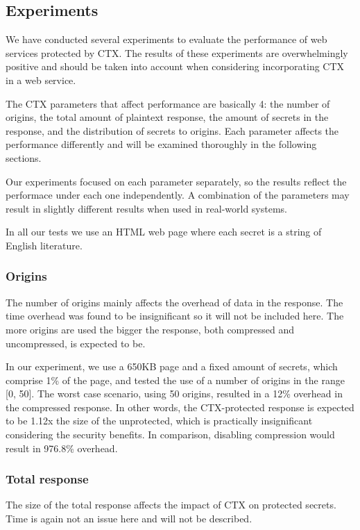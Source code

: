 \documentclass[a4paper, 11 pt, conference]{article}  %
\begin{document}
\subsection{Experiments}
We have conducted several experiments to evaluate the performance of web
services protected by CTX. The results of these experiments are overwhelmingly
positive and should be taken into account when considering incorporating CTX in
a web service.

The CTX parameters that affect performance are basically 4: the number of
origins, the total amount of plaintext response, the amount of secrets in the
response, and the distribution of secrets to origins. Each parameter affects the
performance differently and will be examined thoroughly in the following
sections.

Our experiments focused on each parameter separately, so the results reflect the
performace under each one independently. A combination of the parameters may
result in slightly different results when used in real-world systems.

In all our tests we use an HTML web page where each secret is a string of
English literature.

\subsubsection{Origins}
The number of origins mainly affects the overhead of data in the response. The
time overhead was found to be insignificant so it will not be included here. The
more origins are used the bigger the response, both compressed and uncompressed,
is expected to be.

In our experiment, we use a 650KB page and a fixed amount of secrets, which
comprise 1\% of the page, and tested the use of a number of origins in the range
[0, 50]. The worst case scenario, using 50 origins, resulted in a 12\% overhead
in the compressed response. In other words, the CTX-protected response is
expected to be 1.12x the size of the unprotected, which is practically
insignificant considering the security benefits. In comparison, disabling
compression would result in 976.8\% overhead.

\subsubsection{Total response}
The size of the total response affects the impact of CTX on protected secrets.
Time is again not an issue here and will not be described.
\end{document}
